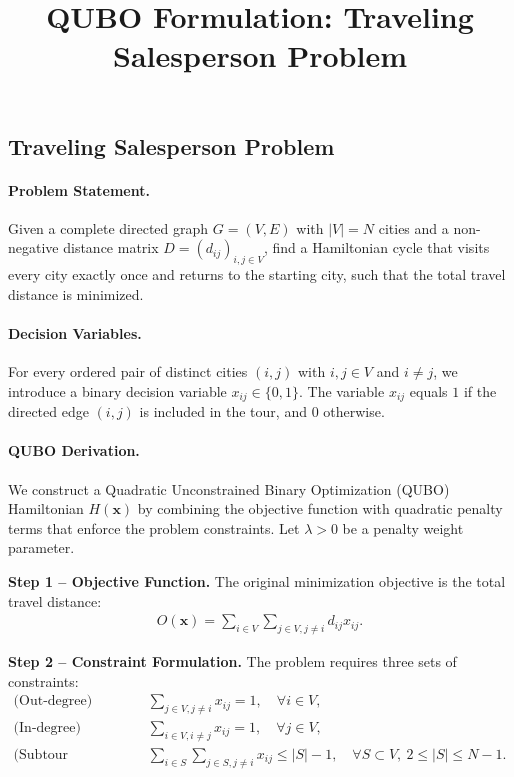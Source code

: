 \documentclass[12pt]{article}
\title{QUBO Formulation: Traveling Salesperson Problem}
\date{}
\begin{document}
\maketitle

\subsection*{Traveling Salesperson Problem}

\paragraph{Problem Statement.}
Given a complete directed graph $G = (V, E)$ with $|V| = N$ cities and a non-negative distance matrix $D = (d_{ij})_{i,j \in V}$, find a Hamiltonian cycle that visits every city exactly once and returns to the starting city, such that the total travel distance is minimized.

\paragraph{Decision Variables.}
For every ordered pair of distinct cities $(i, j)$ with $i, j \in V$ and $i \neq j$, we introduce a binary decision variable $x_{ij} \in \{0, 1\}$. The variable $x_{ij}$ equals $1$ if the directed edge $(i, j)$ is included in the tour, and $0$ otherwise.

\paragraph{QUBO Derivation.}
We construct a Quadratic Unconstrained Binary Optimization (QUBO) Hamiltonian $H(\mathbf{x})$ by combining the objective function with quadratic penalty terms that enforce the problem constraints. Let $\lambda > 0$ be a penalty weight parameter.

\textbf{Step 1 -- Objective Function.}
The original minimization objective is the total travel distance:
\begin{align}
    O(\mathbf{x}) = \sum_{i \in V} \sum_{j \in V, j \neq i} d_{ij} x_{ij}.
\end{align}

\textbf{Step 2 -- Constraint Formulation.}
The problem requires three sets of constraints:
\begin{align}
    \text{(Out-degree)} \quad & \sum_{j \in V, j \neq i} x_{ij} = 1, \quad \forall i \in V, \\
    \text{(In-degree)} \quad & \sum_{i \in V, i \neq j} x_{ij} = 1, \quad \forall j \in V, \\
    \text{(Subtour elimination)} \quad & \sum_{i \in S} \sum_{j \in S, j \neq i} x_{ij} \le |S| - 1, \quad \forall S \subset V, \ 2 \le |S| \le N-1.
\end{align}
\end{document}
